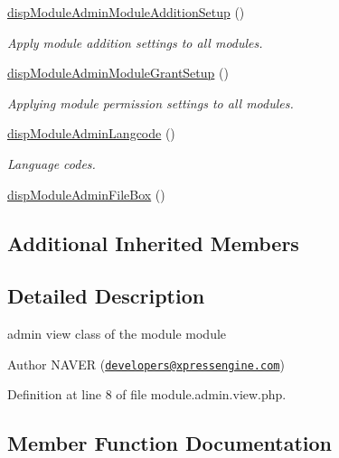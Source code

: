 \begin{DoxyCompactItemize}
\hyperlink{classmoduleAdminView_aa880758b1a06f6ba2417311b1a1a9fc8}{disp\+Module\+Admin\+Module\+Addition\+Setup} ()
\begin{DoxyCompactList}\small\item\em Apply module addition settings to all modules. \end{DoxyCompactList}\item 
\hyperlink{classmoduleAdminView_a132b98243602c81f583f4746a04628d7}{disp\+Module\+Admin\+Module\+Grant\+Setup} ()
\begin{DoxyCompactList}\small\item\em Applying module permission settings to all modules. \end{DoxyCompactList}\item 
\hyperlink{classmoduleAdminView_af7dbb67dd855f4acb840b6ffbdf4a80c}{disp\+Module\+Admin\+Langcode} ()
\begin{DoxyCompactList}\small\item\em Language codes. \end{DoxyCompactList}\item 
\hyperlink{classmoduleAdminView_a71cf5716a6b8d0dde832c2e171518bdd}{disp\+Module\+Admin\+File\+Box} ()
\end{DoxyCompactItemize}
\subsection*{Additional Inherited Members}


\subsection{Detailed Description}
admin view class of the module module 

\begin{DoxyAuthor}{Author}
N\+A\+V\+ER (\href{mailto:developers@xpressengine.com}{\tt developers@xpressengine.\+com}) 
\end{DoxyAuthor}


Definition at line 8 of file module.\+admin.\+view.\+php.



\subsection{Member Function Documentation}
\hypertarget{classmoduleAdminView_a1e6312f7a841064603ba51ad835f4e28}{}\label{classmoduleAdminView_a1e6312f7a841064603ba51ad835f4e28} 
